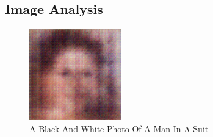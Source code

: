 \documentclass{article}%
\begin{document}
%
\subsection{Image Analysis}%
\label{subsec:ImageAnalysis}%


\begin{figure}[h!]%
\centering%
\includegraphics[width=150px]{500_fake_images/samples_5_216.png}%
\caption{A Black And White Photo Of A Man In A Suit}%
\end{figure}

%
\end{document}

